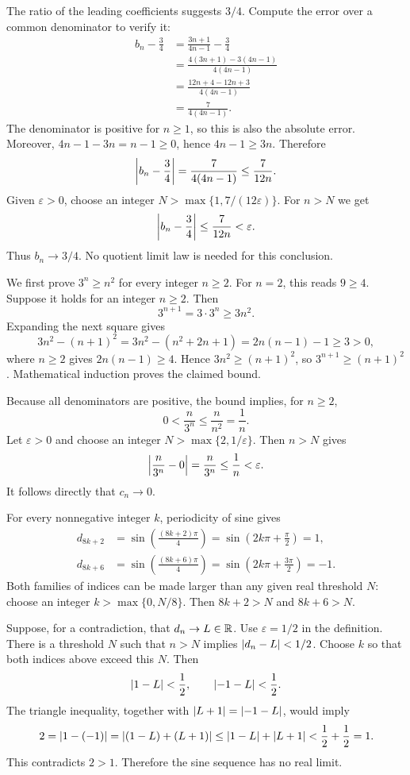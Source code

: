 The ratio of the leading coefficients suggests $3/4$.
Compute the error over a common denominator to verify it:
\begin{align*}
 b_n-\frac34
 &=\frac{3n+1}{4n-1}-\frac34\\
 &=\frac{4(3n+1)-3(4n-1)}{4(4n-1)}\\
 &=\frac{12n+4-12n+3}{4(4n-1)}\\
 &=\frac7{4(4n-1)}.
\end{align*}
The denominator is positive for $n\ge1$, so this is also the
absolute error. Moreover,
$4n-1-3n=n-1\ge0$, hence $4n-1\ge3n$. Therefore
\[
 \left|b_n-\frac34\right|
 =\frac7{4(4n-1)}\le\frac7{12n}.
\]
Given $\varepsilon>0$, choose an integer
$N>\max\{1,7/(12\varepsilon)\}$. For $n>N$ we get
\[
 \left|b_n-\frac34\right|\le\frac7{12n}<\varepsilon.
\]
Thus $b_n\to3/4$. No quotient limit law is needed for this conclusion.

We first prove $3^n\ge n^2$ for every integer $n\ge2$.
For $n=2$, this reads $9\ge4$. Suppose it holds for an integer
$n\ge2$. Then
\[
 3^{n+1}=3\cdot3^n\ge3n^2.
\]
Expanding the next square gives
\[
 3n^2-(n+1)^2
 =3n^2-(n^2+2n+1)
 =2n(n-1)-1\ge3>0,
\]
where $n\ge2$ gives $2n(n-1)\ge4$.
Hence $3n^2\ge(n+1)^2$, so $3^{n+1}\ge(n+1)^2$.
Mathematical induction proves the claimed bound.

Because all denominators are positive, the bound implies, for $n\ge2$,
\[
 0<\frac n{3^n}\le\frac n{n^2}=\frac1n.
\]
Let $\varepsilon>0$ and choose an integer
$N>\max\{2,1/\varepsilon\}$. Then $n>N$ gives
\[
 \left|\frac n{3^n}-0\right|
 =\frac n{3^n}\le\frac1n<\varepsilon.
\]
It follows directly that $c_n\to0$.

For every nonnegative integer $k$, periodicity of sine gives
\begin{align*}
 d_{8k+2}
 &=\sin\left(\frac{(8k+2)\pi}{4}\right)
  =\sin\left(2k\pi+\frac\pi2\right)=1,\\
 d_{8k+6}
 &=\sin\left(\frac{(8k+6)\pi}{4}\right)
  =\sin\left(2k\pi+\frac{3\pi}{2}\right)=-1.
\end{align*}
Both families of indices can be made larger than any given real
threshold $N$: choose an integer $k>\max\{0,N/8\}$.
Then $8k+2>N$ and $8k+6>N$.

Suppose, for a contradiction, that $d_n\to L\in\mathbb{R}$.
Use $\varepsilon=1/2$ in the definition. There is a threshold $N$
such that $n>N$ implies $\left|d_n-L\right|<1/2$.
Choose $k$ so that both indices above exceed this $N$. Then
\[
 \left|1-L\right|<\frac12,
 \qquad \left|-1-L\right|<\frac12.
\]
The triangle inequality, together with
$\left|L+1\right|=\left|-1-L\right|$, would imply
\[
 2=\left|1-(-1)\right|
   =\left|(1-L)+(L+1)\right|
   \le\left|1-L\right|+\left|L+1\right|
   <\frac12+\frac12=1.
\]
This contradicts $2>1$. Therefore the sine sequence has no real limit.

